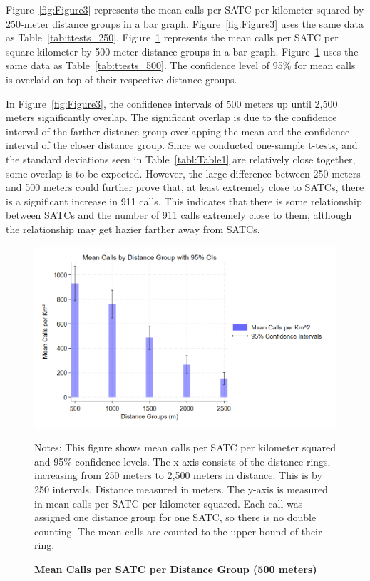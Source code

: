 \documentclass[12pt]{article}
\begin{document}
Figure~\ref{fig:Figure3} represents the mean calls per SATC per kilometer squared by 250-meter distance groups in a bar graph. Figure~\ref{fig:Figure3} uses the same data as Table~\ref{tab:ttests_250}. Figure~\ref{fig:Figure4} represents the mean calls per SATC per square kilometer by 500-meter distance groups in a bar graph. Figure~\ref{fig:Figure4} uses the same data as Table~\ref{tab:ttests_500}. The confidence level of 95\% for mean calls is overlaid on top of their respective distance groups. 

In Figure~\ref{fig:Figure3}, the confidence intervals of 500 meters up until 2,500 meters significantly overlap. The significant overlap is due to the confidence interval of the farther distance group overlapping the mean and the confidence interval of the closer distance group. Since we conducted one-sample t-tests,  and the standard deviations seen in Table~\ref{tabl:Table1} are relatively close together, some overlap is to be expected. However, the large difference between 250 meters and 500 meters could further prove that, at least extremely close to SATCs, there is a significant increase in 911 calls. This indicates that there is some relationship between SATCs and the number of 911 calls extremely close to them, although the relationship may get hazier farther away from SATCs.

\begin{figure}[H]
    \centering
\includegraphics[width=0.75\linewidth]{Reproducibility Package/Downloaded_calls/Visual_Graphics_Downloaded_calls/500_CI_Graph.png}
    \caption{\textbf{Mean Calls per SATC per Distance Group (500 meters)}}
    \label{fig:Figure4}
    \centering\footnotesize{Notes: This figure shows mean calls per SATC per kilometer squared and 95\% confidence levels. The x-axis consists of the distance rings, increasing from 250 meters to 2,500 meters in distance. This is by 250 intervals. Distance measured in meters. The y-axis is measured in mean calls per SATC per kilometer squared. Each call was assigned one distance group for one SATC, so there is no double counting. The mean calls are counted to the upper bound of their ring.}
\end{figure}
\end{document}
